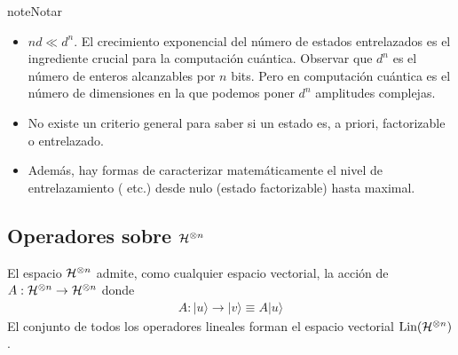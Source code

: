 \documentclass[letterpaper,10pt,english]{jupyterBook}
\newcommand{\ket}[1]{|#1\rangle}
\newcommand{\Hil}{{\cal H}}
\newcommand{\Lin}{\hbox{Lin}}
\begin{document}
\begin{sphinxadmonition}{note}{Notar}
\begin{itemize}
\item {} 
\sphinxAtStartPar
\(nd \ll d^n\). El crecimiento exponencial del número de estados entrelazados es el ingrediente crucial para la computación cuántica. Observar que \(d^n\) es el número de enteros alcanzables por \(n\) bits. Pero en computación cuántica es el número de dimensiones en la que podemos poner \(d^n\) amplitudes complejas.

\item {} 
\sphinxAtStartPar
No existe un criterio general para saber si un estado es, a priori, factorizable o entrelazado.

\item {} 
\sphinxAtStartPar
Además, hay formas de caracterizar matemáticamente el nivel de entrelazamiento ( etc.) desde nulo (estado factorizable) hasta maximal.

\end{itemize}
\end{sphinxadmonition}


\subsection{Operadores sobre  \protect\(\Hil^{\otimes n}\protect\)}
\label{\detokenize{docs/Part_01_Formalismo/Chapter_01_02_Formalismo_matem_xe1tico/01_04_Tensores_myst:operadores-sobre-hil-otimes-n}}
\sphinxAtStartPar
El espacio \(\Hil^{\otimes n}\) admite, como cualquier espacio vectorial, la acción de  \(A: \Hil^{\otimes n} \to \Hil^{\otimes n}\) donde
\begin{equation*}
\begin{split}
A:\ket{u} \to \ket{v} \equiv A\ket{u}
\end{split}
\end{equation*}
\sphinxAtStartPar
El conjunto de todos los operadores lineales forman el espacio vectorial \(\Lin(\Hil^{\otimes n})\).
\end{document}
